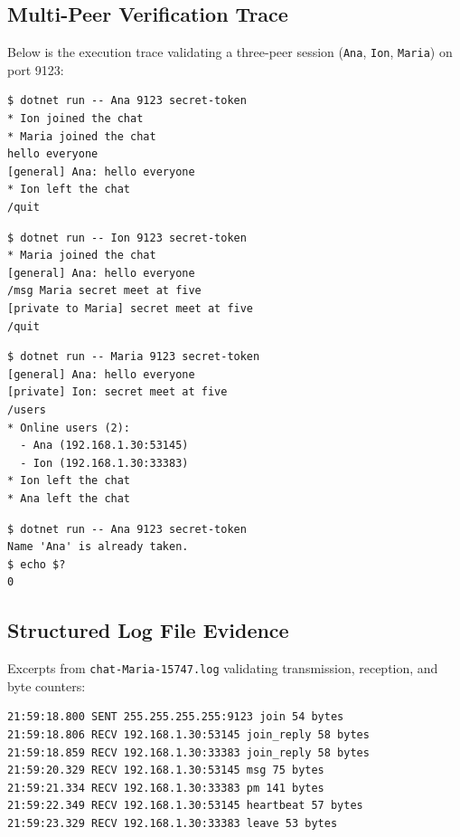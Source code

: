\documentclass[11pt,a4paper]{article}
\begin{document}
\subsection{Multi-Peer Verification Trace}
Below is the execution trace validating a three-peer session (\texttt{Ana}, \texttt{Ion}, \texttt{Maria}) on port 9123:

\begin{lstlisting}[caption={Terminal 1 (Ana)}]
$ dotnet run -- Ana 9123 secret-token
* Ion joined the chat
* Maria joined the chat
hello everyone
[general] Ana: hello everyone
* Ion left the chat
/quit
\end{lstlisting}

\begin{lstlisting}[caption={Terminal 2 (Ion)}]
$ dotnet run -- Ion 9123 secret-token
* Maria joined the chat
[general] Ana: hello everyone
/msg Maria secret meet at five
[private to Maria] secret meet at five
/quit
\end{lstlisting}

\begin{lstlisting}[caption={Terminal 3 (Maria)}]
$ dotnet run -- Maria 9123 secret-token
[general] Ana: hello everyone
[private] Ion: secret meet at five
/users
* Online users (2):
  - Ana (192.168.1.30:53145)
  - Ion (192.168.1.30:33383)
* Ion left the chat
* Ana left the chat
\end{lstlisting}

\begin{lstlisting}[caption={Terminal 4 (Testing Duplicate Name Conflict)}]
$ dotnet run -- Ana 9123 secret-token
Name 'Ana' is already taken.
$ echo $?
0
\end{lstlisting}

\subsection{Structured Log File Evidence}
Excerpts from \texttt{chat-Maria-15747.log} validating transmission, reception, and byte counters:
\begin{lstlisting}
21:59:18.800 SENT 255.255.255.255:9123 join 54 bytes
21:59:18.806 RECV 192.168.1.30:53145 join_reply 58 bytes
21:59:18.859 RECV 192.168.1.30:33383 join_reply 58 bytes
21:59:20.329 RECV 192.168.1.30:53145 msg 75 bytes
21:59:21.334 RECV 192.168.1.30:33383 pm 141 bytes
21:59:22.349 RECV 192.168.1.30:53145 heartbeat 57 bytes
21:59:23.329 RECV 192.168.1.30:33383 leave 53 bytes
\end{lstlisting}

\end{document}
